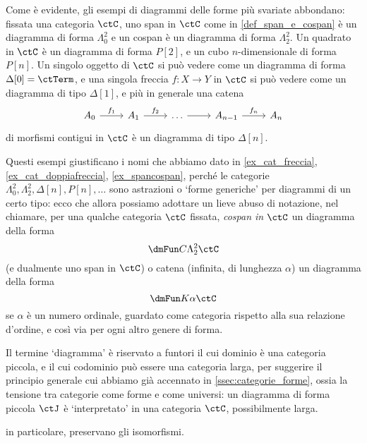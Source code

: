 \begin{remark}
	Come è evidente, gli esempi di diagrammi delle forme più svariate abbondano: fissata una categoria \(\ctC\), uno span in \(\ctC\) come in \ref{def_span_e_cospan} è un diagramma di forma \(\Lambda^2_0\) e un cospan è un diagramma di forma \(\Lambda^2_2\). Un quadrato in \(\ctC\) è un diagramma di forma \(P[2]\), e un cubo \(n\)-dimensionale di forma \(P[n]\). Un singolo oggetto di \(\ctC\) si può vedere come un diagramma di forma \(\Delta[0]=\ctTerm\), e una singola freccia \(f : X\to Y\) in \(\ctC\) si può vedere come un diagramma di tipo \(\Delta[1]\), e più in generale una catena
	\[\begin{tikzcd}
			A_0 \ar[r, "f_1"] & A_1 \ar[r, "f_2"] & \dots \ar[r] & A_{n-1} \ar[r, "f_n"] & A_n
		\end{tikzcd}
	\]
	di morfismi contigui in \(\ctC\) è un diagramma di tipo \(\Delta[n]\).

	Questi esempi giustificano i nomi che abbiamo dato in \ref{ex_cat_freccia}, \ref{ex_cat_doppiafreccia}, \ref{ex_spancospan}, perché le categorie \(\Lambda^2_0,\Lambda^2_2,\Delta[n], P[n], \dots\)  sono astrazioni o `forme generiche' per diagrammi di un certo tipo: ecco che allora possiamo adottare un lieve abuso di notazione, nel chiamare, per una qualche categoria $\ctC$ fissata, \emph{cospan in $\ctC$} un diagramma della forma 
	\[\dmFun C{\Lambda^2_2}\ctC\]
	(e dualmente uno span in $\ctC$) o catena (infinita, di lunghezza $\alpha$) un diagramma della forma 
	\[\dmFun K\alpha\ctC\]
	se $\alpha$ è un numero ordinale, guardato come categoria rispetto alla sua relazione d'ordine, e così via per ogni altro genere di forma.
\end{remark}
\begin{remark}
	Il termine `diagramma' è riservato a funtori il cui dominio è una categoria piccola, e il cui codominio può essere una categoria larga, per suggerire il principio generale cui abbiamo già accennato in \ref{ssec:categorie_forme}, ossia la tensione tra categorie come forme e come universi: un diagramma di forma piccola \(\ctJ\) è `interpretato' in una categoria \(\ctC\), possibilmente larga.
\end{remark}
\begin{lemma}\label{lem_funtori_preservano_comm}
	 in particolare, preservano gli isomorfismi.
\end{lemma}

